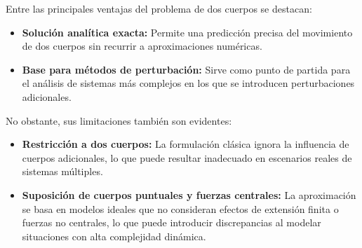 Entre las principales ventajas del problema de dos cuerpos se destacan:
\begin{itemize}
    \item \textbf{Solución analítica exacta:} Permite una predicción precisa del movimiento de dos cuerpos sin recurrir a aproximaciones numéricas.
    \item \textbf{Base para métodos de perturbación:} Sirve como punto de partida para el análisis de sistemas más complejos en los que se introducen perturbaciones adicionales.
\end{itemize}
No obstante, sus limitaciones también son evidentes:
\begin{itemize}
    \item \textbf{Restricción a dos cuerpos:} La formulación clásica ignora la influencia de cuerpos adicionales, lo que puede resultar inadecuado en escenarios reales de sistemas múltiples.
    \item \textbf{Suposición de cuerpos puntuales y fuerzas centrales:} La aproximación se basa en modelos ideales que no consideran efectos de extensión finita o fuerzas no centrales, lo que puede introducir discrepancias al modelar situaciones con alta complejidad dinámica. %
\end{itemize}